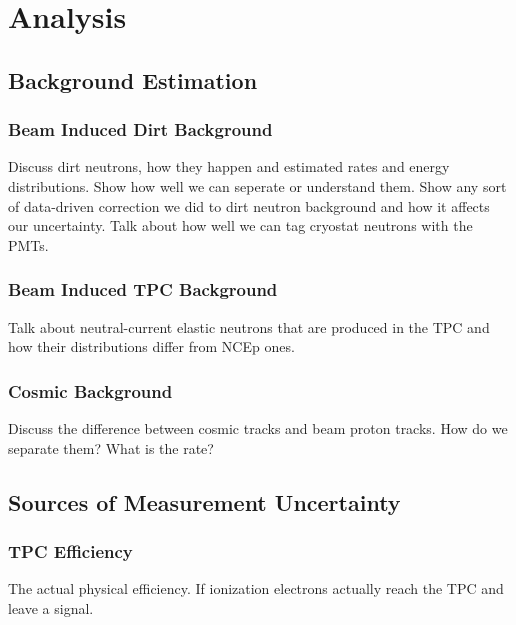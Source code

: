 \section{Analysis}\label{analysis}
\hspace{\parindent}

\subsection{Background Estimation}\label{background}
  \subsubsection{Beam Induced Dirt Background}
    Discuss dirt neutrons, how they happen and estimated rates and energy
    distributions.  Show how well we can seperate or understand them. Show any
    sort of data-driven correction we did to dirt neutron background and how it
    affects our uncertainty. Talk about how well we can tag cryostat neutrons
    with the PMTs.
  \subsubsection{Beam Induced TPC Background}
    Talk about neutral-current elastic neutrons that are produced in the TPC
    and how their distributions differ from NCEp ones.
  \subsubsection{Cosmic Background}
    Discuss the difference between cosmic tracks and beam proton tracks. How do
    we separate them? What is the rate?

\subsection{Sources of Measurement Uncertainty}\label{uncertainties}
  \subsubsection{TPC Efficiency}
    The actual physical efficiency. If ionization electrons actually reach the
    TPC and leave a signal.
